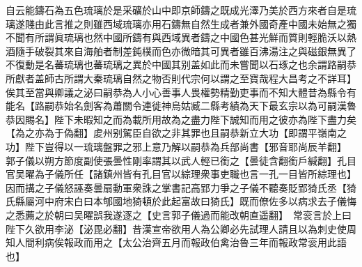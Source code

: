 自云能鑄石為五色琉璃於是采礦於山中即京師鑄之既成光澤乃美於西方來者自是琉璃遂賤由此言推之則雖西域琉璃亦用石鑄無自然生成者兼外國奇產中國未始無之獨不聞有所謂眞琉璃也然中國所鑄有與西域異者鑄之中國色甚光鮮而質則輕脆沃以熱酒隨手破裂其來自海舶者制差鈍樸而色亦微暗其可異者雖百沸湯注之與磁銀無異了不復動是名蕃琉璃也蕃琉璃之異於中國其别盖如此而未嘗聞以石琢之也余謂路嗣恭所獻者盖師古所謂大秦琉璃自然之物否則代宗何以謂之至寶哉程大昌考之不詳耳】俟其至當與卿議之泌曰嗣恭為人小心善事人畏權勢精勤吏事而不知大體昔為縣令有能名【路嗣恭始名劍客為蕭關令連徙神烏姑臧二縣考績為天下最玄宗以為可嗣漢魯恭因賜名】陛下未暇知之而為載所用故為之盡力陛下誠知而用之彼亦為陛下盡力矣【為之亦為于偽翻】䖍州别駕臣自欲之非其罪也且嗣恭新立大功【即謂平嶺南之功】陛下豈得以一琉璃盤罪之邪上意乃解以嗣恭為兵部尚書【邪音耶尚辰羊翻】　郭子儀以朔方節度副使張曇性剛率謂其以武人輕已銜之【曇徒含翻銜戶緘翻】孔目官吴曜為子儀所任【諸鎮州皆有孔目官以綜理衆事吏職也言一孔一目皆所綜理也】因而搆之子儀怒誣奏曇扇動軍衆誅之掌書記高郢力爭之子儀不聽奏貶郢猗氏丞【猗氏縣屬河中府宋白曰本郇國地猗頓於此起富故曰猗氏】既而僚佐多以病求去子儀悔之悉薦之於朝曰吴曜誤我遂逐之【史言郭子儀過而能改朝直遥翻】　常衮言於上曰陛下久欲用李泌【泌毘必翻】昔漢宣帝欲用人為公卿必先試理人請且以為刺史使周知人間利病俟報政而用之【太公治齊五月而報政伯禽治魯三年而報政常衮用此語也】

